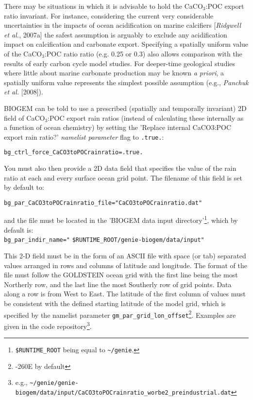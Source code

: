 \documentclass[11pt,fleqn]{book} %
\begin{document}
There may be situations in which it is advisable to hold the CaCO\begin{math}_3\end{math}:POC export ratio invariant. For instance, considering the current very considerable uncertainties in the impacts of ocean acidification on marine calcifiers [\textit{Ridgwell et al.}, 2007a] the safest assumption is arguably to exclude any acidification impact on calcification and carbonate export. Specifying a spatially uniform value of the CaCO\begin{math}_3\end{math}:POC ratio ratio (e.g. 0.25 or 0.3) also allows comparison with the results of early carbon cycle model studies. For deeper-time geological studies where little about marine carbonate production may be known \textit{a priori}, a spatially uniform value represents the simplest possible assumption (e.g., \textit{Panchuk et al.} [2008]).

BIOGEM can be told to use a prescribed (spatially and temporally invariant) 2D field of CaCO\begin{math}_3\end{math}:POC export rain ratios (instead of calculating these internally as a function of ocean chemistry) by setting the 'Replace internal CaCO3:POC export rain ratio?' \textit{namelist parameter} flag to \texttt{.true.}:
\vspace{-2pt}\begin{verbatim}
bg_ctrl_force_CaCO3toPOCrainratio=.true.
\end{verbatim}\vspace{-2pt}
You must also then provide a 2D data field that specifies the value of the rain ratio at each and every surface ocean grid point. The filename of this field is set by default to:
\vspace{-2mm}\begin{verbatim}
bg_par_CaCO3toPOCrainratio_file="CaCO3toPOCrainratio.dat"
\end{verbatim}\vspace{-2mm}
and the file must be located in the 'BIOGEM data input directory'\footnote{\texttt{\$RUNTIME\_ROOT} being equal to \texttt{\~{}/genie}.}, which by default is:
\\\texttt{bg\_par\_indir\_name="} \texttt{\$RUNTIME\_ROOT/genie-biogem/data/input"}

This 2-D field must be in the form of an ASCII file with space (or tab) separated values arranged in rows and columns of latitude and longitude. The format of the file must follow the GOLDSTEIN ocean grid with the first line being the most Northerly row, and the last line the most Southerly row of grid points. Data along a row is from West to East. The latitude of the first column of values must be consistent with the defined starting latitude of the model grid, which is specified by the namelist parameter \texttt{gm\_par\_grid\_lon\_offset}\footnote{-260E by default}. Examples are given in the code repository\footnote{e.g., \texttt{\~{}/genie/genie-biogem/data/input/CaCO3toPOCrainratio\_worbe2\_preindustrial.dat}}.
\end{document}
